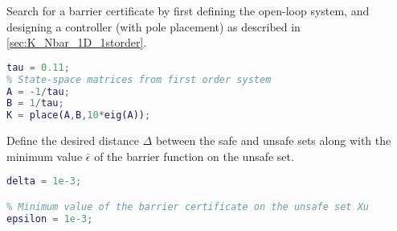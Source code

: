Search for a barrier certificate by first defining the open-loop system, and designing a controller (with pole placement) as described in \autoref{sec:K_Nbar_1D_1storder}.
\begin{lstlisting}[language=matlab]
% Time constant from measurement
tau = 0.11;
% State-space matrices from first order system
A = -1/tau;
B = 1/tau;
K = place(A,B,10*eig(A));
\end{lstlisting}
Define the desired distance $\Delta$ between the safe and unsafe sets along with  the minimum value $\bar{\epsilon}$ of the barrier function on the unsafe set. %
\begin{lstlisting}[language=matlab]
% Distance between defined safe and unsafe regions
delta = 1e-3;

% Minimum value of the barrier certificate on the unsafe set Xu
epsilon = 1e-3;
\end{lstlisting}

